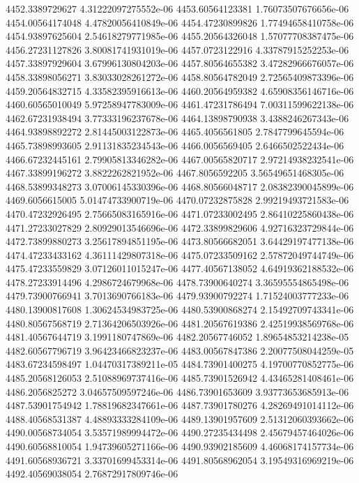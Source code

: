 {4452.3389729627 4.31222097275552e-06
4453.60564123381 1.76073507676656e-06
4454.00564174048 4.47820056410849e-06
4454.47230899826 1.77494658410758e-06
4454.93897625604 2.54618279771985e-06
4455.20564326048 1.57077708387475e-06
4456.27231127826 3.80081741931019e-06
4457.0723122916 4.33787915252253e-06
4457.33897929604 3.67996130804203e-06
4457.80564655382 3.47282966676057e-06
4458.33898056271 3.83033028261272e-06
4458.80564782049 2.72565409873396e-06
4459.20564832715 4.33582395916613e-06
4460.20564959382 4.65908356146716e-06
4460.60565010049 5.97258947783009e-06
4461.47231786494 7.00311599622138e-06
4462.67231938494 3.77333196237678e-06
4464.13898790938 3.4388246267343e-06
4464.93898892272 2.81445003122873e-06
4465.4056561805 2.7847799645594e-06
4465.73898993605 2.91131835234543e-06
4466.0056569405 2.6466502522434e-06
4466.67232445161 2.79905813346282e-06
4467.00565820717 2.97214938232541e-06
4467.33899196272 3.8822262821952e-06
4467.8056592205 3.56549651468305e-06
4468.53899348273 3.07006145330396e-06
4468.80566048717 2.08382390045899e-06
4469.6056615005 5.01474733900719e-06
4470.07232875828 2.99219493721583e-06
4470.47232926495 2.75665083165916e-06
4471.07233002495 2.86410225860438e-06
4471.27233027829 2.80929013546696e-06
4472.33899829606 4.92716323729844e-06
4472.73899880273 3.25617894851195e-06
4473.80566682051 3.64429197477138e-06
4474.47233433162 4.36111429807318e-06
4475.07233509162 2.57872049744749e-06
4475.47233559829 3.07126011015247e-06
4477.40567138052 4.64919362188532e-06
4478.27233914496 4.2986724679968e-06
4478.73900640274 3.36595554865498e-06
4479.73900766941 3.7013690766183e-06
4479.93900792274 1.71524003777233e-06
4480.13900817608 1.30624534983725e-06
4480.53900868274 2.15492709743341e-06
4480.80567568719 2.71364206503926e-06
4481.20567619386 2.42519938569768e-06
4481.40567644719 3.1991180747869e-06
4482.20567746052 1.89654853214238e-05
4482.60567796719 3.96423466823237e-06
4483.00567847386 2.20077508044259e-05
4483.67234598497 1.04470317389211e-05
4484.73901400275 4.19700770852775e-06
4485.20568126053 2.51088969737416e-06
4485.73901526942 4.43465281408461e-06
4486.2056825272 3.04657509597246e-06
4486.73901653609 3.93773653685913e-06
4487.53901754942 1.78819682347661e-06
4487.73901780276 4.28269491014112e-06
4488.40568531387 4.48893333284109e-06
4489.13901957609 2.51312060393662e-06
4490.00568734054 3.53571989994472e-06
4490.27235434498 2.45679457464026e-06
4490.60568810054 1.94739605271166e-06
4490.93902185609 4.46068174157734e-06
4491.60568936721 3.33701699453314e-06
4491.80568962054 3.19549316969219e-06
4492.40569038054 2.76872917809746e-06
}
